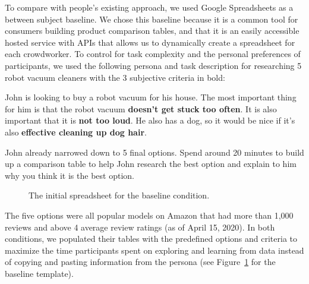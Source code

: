 To compare \SYSTEM with people’s existing approach, we used Google Spreadsheets as a between subject baseline. We chose this baseline because it is a common tool for consumers building product comparison tables, and that it is an easily accessible hosted service with APIs that allows us to dynamically create a spreadsheet for each crowdworker. To control for task complexity and the personal preferences of participants, we used the following persona and task description for researching 5 robot vacuum cleaners with the 3 subjective criteria in bold: 

\begin{tightquote}
John is looking to buy a robot vacuum for his house. The most important thing for him is that the robot vacuum \textbf{doesn't get stuck too often}. It is also important that it is \textbf{not too loud}. He also has a dog, so it would be nice if it's also \textbf{effective cleaning up dog hair}.

John already narrowed down to 5 final options. Spend around 20 minutes to build up a comparison table to help John research the best option and explain to him why you think it is the best option.
\end{tightquote}

\begin{figure}
    \centering
    \textcolor{gray}{}
    \caption{The initial spreadsheet for the baseline condition.}
    \label{fig:baseline}
\end{figure}

The five options were all popular models on Amazon that had more than 1,000 reviews and above 4 average review ratings (as of April 15, 2020). In both conditions, we populated their tables with the predefined options and criteria to maximize the time participants spent on exploring and learning from data instead of copying and pasting information from the persona (see Figure~\ref{fig:baseline} for the baseline template).

